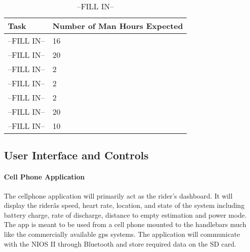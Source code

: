 \documentclass[12pt,article]{IEEEtran}
\begin{document}
        \begin{table}[H]        
            \renewcommand{\arraystretch}{1.3}
    			\caption{--FILL IN--}
    			
    			\label{--FILL IN--}
    			
    			\centering
    			\begin{tabular}{p{4cm}|p{4cm}}
    			\hline
    			\bfseries 	Task 			        	& \bfseries Number of Man Hours Expected        \\
    			\hline\hline
    						--FILL IN-- 		        & 16						    	            \\
    						--FILL IN--    	        	& 20			                                \\	
    						--FILL IN--         	    & 2				                                \\	
    						--FILL IN--             	& 2				                                \\
                            --FILL IN--                 & 2						                        \\
    						--FILL IN--             	& 20			                                \\	
    						--FILL IN--    	            & 10				                            \\	
    				        \hline	
    			\end{tabular}
		\end{table}
    
    \subsection{User Interface and Controls}
        \paragraph{Cell Phone Application}
            The cellphone application will primarily act as the rider's dashboard. It will display the 
            riderâs speed, heart rate, location, and state of the system including battery charge, rate 
            of discharge, distance to empty estimation and power mode. The app is meant to be used from 
            a cell phone mounted to the handlebars much like the commercially available gps systems. The
            application will communicate with the NIOS II through Bluetooth and store required data on the 
            SD card. 
            
\end{document}
